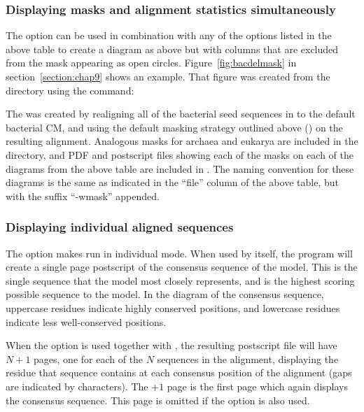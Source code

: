 \subsubsection{Displaying masks and alignment statistics simultaneously}

The  option can be used in combination with any of the
options listed in the above table to create a diagram as above but
with columns that are excluded from the mask appearing as open
circles. Figure~\ref{fig:bacdelmask} in section~\ref{section:chap9}
shows an example. That figure was created from the
 directory using the command:


The  was created by realigning all
of the bacterial seed sequences in
 to the default bacterial
CM, and using the default masking strategy outlined above 
()
on the resulting alignment. Analogous masks for archaea and eukarya
are included in the  directory, and PDF and
postscript files showing each of the masks on each of the diagrams
from the above table are included in 
. The naming convention for
these diagrams is the same as indicated in the ``file'' column of the
above table, but with the suffix ``-wmask'' appended.

\subsubsection{Displaying individual aligned sequences}

The  option makes  run in individual
mode. When used by itself, the program will create a single page
postscript of the consensus sequence of the model. This is the
single sequence that the model most closely represents, and is the
highest scoring possible sequence to the model. In the diagram of the
consensus sequence, uppercase residues indicate highly conserved positions,
and lowercase residues indicate less well-conserved positions.

When the  option is used together with , the
resulting postscript file will have $N+1$ pages, one for each of the
$N$ sequences in the alignment, displaying the residue that sequence
contains at each consensus position of the alignment (gaps are
indicated by \prog{-} characters). The $+1$ page is the first page
which again displays the consensus sequence. This page is omitted if
the  option is also used.

